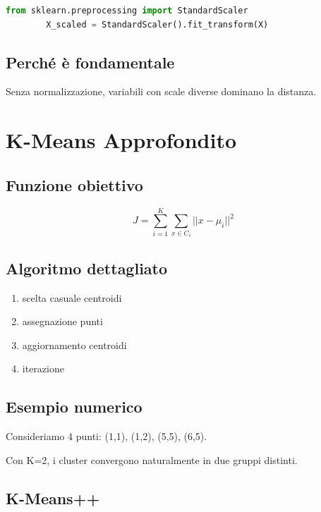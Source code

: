\documentclass[12pt,a4paper]{article}
\begin{document}
	\begin{lstlisting}[language=Python]
		from sklearn.preprocessing import StandardScaler
		X_scaled = StandardScaler().fit_transform(X)
	\end{lstlisting}
	
	\subsection{Perché è fondamentale}
	
	Senza normalizzazione, variabili con scale diverse dominano la distanza.
	
	\section{K-Means Approfondito}
	
	\subsection{Funzione obiettivo}
	
	\begin{equation}
		J = \sum_{i=1}^K \sum_{x \in C_i} ||x - \mu_i||^2
	\end{equation}
	
	\subsection{Algoritmo dettagliato}
	
	\begin{enumerate}
		\item scelta casuale centroidi
		\item assegnazione punti
		\item aggiornamento centroidi
		\item iterazione
	\end{enumerate}
	
	\subsection{Esempio numerico}
	
	Consideriamo 4 punti: (1,1), (1,2), (5,5), (6,5).
	
	Con K=2, i cluster convergono naturalmente in due gruppi distinti.
	
	\subsection{K-Means++}
	
\end{document}
